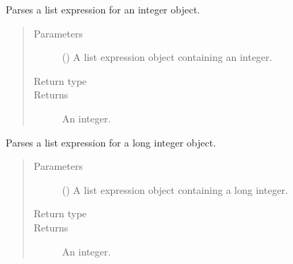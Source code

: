 \documentclass[letterpaper,10pt,english]{sphinxmanual}
\begin{document}
\begin{fulllineitems}
\label{\detokenize{index:secondodb.api.algebras.secondostandardalgebra.parse_int}}
Parses a list expression for an integer object.
\begin{quote}\begin{description}
\item[{Parameters}] \leavevmode
{} () \textendash{} A list expression object containing an integer.

\item[{Return type}] \leavevmode
{}

\item[{Returns}] \leavevmode
An integer.

\end{description}\end{quote}

\end{fulllineitems}


\begin{fulllineitems}
\label{\detokenize{index:secondodb.api.algebras.secondostandardalgebra.parse_longint}}
Parses a list expression for a long integer object.
\begin{quote}\begin{description}
\item[{Parameters}] \leavevmode
{} () \textendash{} A list expression object containing a long integer.

\item[{Return type}] \leavevmode
{}

\item[{Returns}] \leavevmode
An integer.

\end{description}\end{quote}

\end{fulllineitems}
\end{document}
